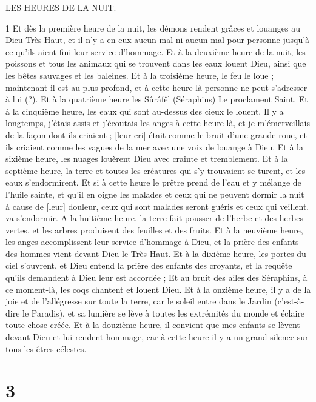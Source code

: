 \par LES HEURES DE LA NUIT.

\par 1 Et dès la première heure de la nuit, les démons rendent grâces et louanges au Dieu Très-Haut, et il n'y a en eux aucun mal ni aucun mal pour personne jusqu'à ce qu'ils aient fini leur service d'hommage. Et à la deuxième heure de la nuit, les poissons et tous les animaux qui se trouvent dans les eaux louent Dieu, ainsi que les bêtes sauvages et les baleines. Et à la troisième heure, le feu le loue ; maintenant il est au plus profond, et à cette heure-là personne ne peut s'adresser à lui (?). Et à la quatrième heure les Sûrâfêl (Séraphins) Le proclament Saint. Et à la cinquième heure, les eaux qui sont au-dessus des cieux le louent. Il y a longtemps, j'étais assis et j'écoutais les anges à cette heure-là, et je m'émerveillais de la façon dont ils criaient ; [leur cri] était comme le bruit d'une grande roue, et ils criaient comme les vagues de la mer avec une voix de louange à Dieu. Et à la sixième heure, les nuages ​​louèrent Dieu avec crainte et tremblement. Et à la septième heure, la terre et toutes les créatures qui s'y trouvaient se turent, et les eaux s'endormirent. Et si à cette heure le prêtre prend de l'eau et y mélange de l'huile sainte, et qu'il en oigne les malades et ceux qui ne peuvent dormir la nuit à cause de [leur] douleur, ceux qui sont malades seront guéris et ceux qui veillent. va s'endormir. A la huitième heure, la terre fait pousser de l'herbe et des herbes vertes, et les arbres produisent des feuilles et des fruits. Et à la neuvième heure, les anges accomplissent leur service d'hommage à Dieu, et la prière des enfants des hommes vient devant Dieu le Très-Haut. Et à la dixième heure, les portes du ciel s'ouvrent, et Dieu entend la prière des enfants des croyants, et la requête qu'ils demandent à Dieu leur est accordée ; Et au bruit des ailes des Séraphins, à ce moment-là, les coqs chantent et louent Dieu. Et à la onzième heure, il y a de la joie et de l'allégresse sur toute la terre, car le soleil entre dans le Jardin (c'est-à-dire le Paradis), et sa lumière se lève à toutes les extrémités du monde et éclaire toute chose créée. Et à la douzième heure, il convient que mes enfants se lèvent devant Dieu et lui rendent hommage, car à cette heure il y a un grand silence sur tous les êtres célestes.

\chapter{3}

